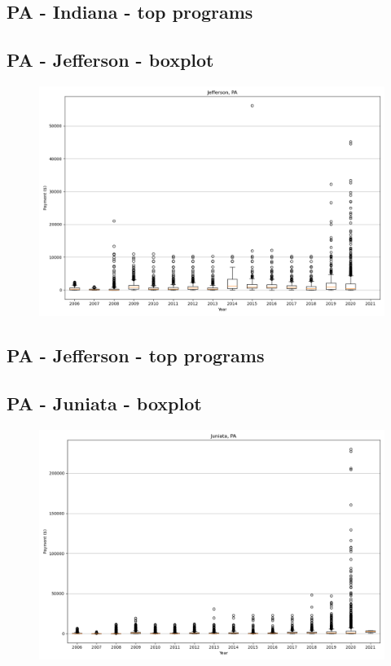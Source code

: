 \subsection*{PA - Indiana - top programs}

\newpage
\subsection*{PA - Jefferson - boxplot}
\begin{figure}[h]
\centering
\includegraphics[width=7in]{../output/boxplots/counties/Jefferson-PA_boxplot.png}
\end{figure}


\subsection*{PA - Jefferson - top programs}

\newpage
\subsection*{PA - Juniata - boxplot}
\begin{figure}[h]
\centering
\includegraphics[width=7in]{../output/boxplots/counties/Juniata-PA_boxplot.png}
\end{figure}



